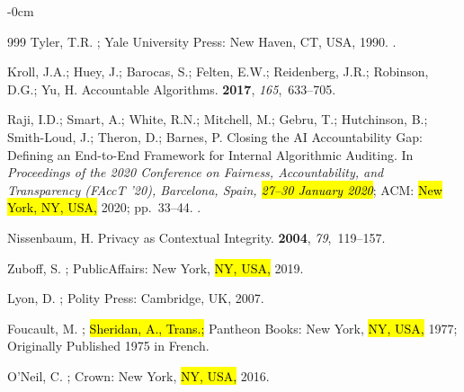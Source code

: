 \documentclass[mca,article,accept,pdftex,oneauthor]{Definitions/mdpi}
\begin{document}
\begin{adjustwidth}{-\extralength}{0cm}
\begin{thebibliography}{999}
Tyler, T.R.
; Yale University Press: New Haven, CT, USA,
  1990.
.

Kroll, J.A.; Huey, J.; Barocas, S.; Felten, E.W.; Reidenberg, J.R.; Robinson,
  D.G.; Yu, H.
\newblock Accountable Algorithms.
 {\bf 2017}, {\em
  165},~633--705.

Raji, I.D.; Smart, A.; White, R.N.; Mitchell, M.; Gebru, T.; Hutchinson, B.;
  Smith-Loud, J.; Theron, D.; Barnes, P.
\newblock Closing the {AI} Accountability Gap: Defining an End-to-End Framework
  for Internal Algorithmic Auditing.
\newblock In \emph{Proceedings of the 2020 Conference on Fairness, Accountability,
  and Transparency (FAccT '20), Barcelona, Spain, \hl{27--30 January 2020}}; ACM: \hl{New York, NY, USA,} 2020;  \mbox{pp. 33--44.}
.

Nissenbaum, H.
\newblock Privacy as Contextual Integrity.
 {\bf 2004}, {\em 79},~119--157.

Zuboff, S.
; PublicAffairs: New York, \hl{NY, USA,}  2019.

Lyon, D.
; Polity Press: Cambridge, UK,
   2007.

Foucault, M.
; \hl{Sheridan, A., Trans.;} %
 Pantheon Books:
  New York, \hl{NY, USA,} 1977;
\newblock Originally Published 1975 in French.

O'Neil, C.
; Crown: New York, \hl{NY, USA,} 2016.


\end{thebibliography}
\end{adjustwidth}
\end{document}
